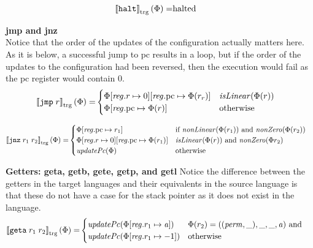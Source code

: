 \documentclass[a4paper]{article}
\newcommand{\sem}[1]{\left\llbracket #1 \right\rrbracket}
\newcommand{\tsem}[2][\Phi]{\sem{#2}_{\mathrm{trg}}(#1)}
\newcommand{\tand}{\text{ and }}
\newcommand{\totherwise}{\text{otherwise }}
\newcommand{\targetcolor}[1]{\color{black}}
\newcommand{\trg}[1]{{\targetcolor{} #1}}
\newcommand{\zinstr}[1]{\texttt{#1}}
\newcommand{\oneinstr}[2]{
  \ifthenelse{\equal{#2}{}}
  {\zinstr{#1}}
  {\zinstr{#1} \; #2}
}
\newcommand{\twoinstr}[3]{
  \ifthenelse{\equal{#2#3}{}}
  {\zinstr{#1}}
  {\zinstr{#1} \; #2 \; #3}
}
\newcommand{\thalt}{\zinstr{\trg{halt}}}
\newcommand{\tjmp}[1]{\oneinstr{\trg{jmp}}{#1}}
\newcommand{\tjnz}[2]{\twoinstr{\trg{jnz}}{#1}{#2}}
\newcommand{\tgeta}[2]{\twoinstr{\trg{geta}}{#1}{#2}}
\newcommand{\update}[2]{[#1 \mapsto #2]}
\newcommand{\updReg}[2]{\update{\reg.#1}{#2}}
\newcommand{\perm}{\var{perm}}
\newcommand{\halted}{\mathrm{halted}}
\newcommand{\var}[1]{\mathit{#1}}
\newcommand{\reg}{\var{reg}}
\newcommand{\aaddr}{\var{a}}
\newcommand{\pcreg}{\mathrm{pc}}
\newcommand{\plainfun}[2]{
  \ifthenelse{\equal{#2}{}}
  {\mathit{#1}}
  {\mathit{#1}(#2)}
}
\newcommand{\updPcAddr}[1]{\plainfun{updatePc}{#1}}
\newcommand{\nonLinear}[1]{\plainfun{nonLinear}{#1}}
\newcommand{\isLinear}[1]{\plainfun{isLinear}{#1}}
\newcommand{\nonZero}[1]{\plainfun{nonZero}{#1}}
\begin{document}
\begin{align*}
  \tsem{\thalt} = & \halted
\end{align*}

\textbf{jmp and jnz}\\
Notice that the order of the updates of the configuration actually matters here. As it is below, a successful jump to $\pcreg$ results in a loop, but if the order of the updates to the configuration had been reversed, then the execution would fail as the $\pcreg$ register would contain 0.
\begin{align*}
  \tsem{\tjmp{r}} = & 
                      \begin{cases}
                        \Phi\updReg{r}{0}\updReg{\pcreg}{\Phi(r_r)}
                             & \isLinear{\Phi(r)} \\
                        \Phi\updReg{\pcreg}{\Phi(r)} & \totherwise
                      \end{cases}
\end{align*}

\begin{align*}
  \tsem{\tjnz{r_1}{r_2}} = &       
                             \begin{cases}
                               \Phi\updReg{\pcreg}{r_1} & \text{if $\nonLinear{\Phi(r_1)}$ and $\nonZero{\Phi(r_2)}$} \\
                               \Phi\updReg{r}{0}\updReg{\pcreg}{\Phi(r_1)}
                                               & \arraycolsep=0pt                               
                                               \begin{array}[t]{l}
                                                 \isLinear{\Phi(r)} \tand
                                                 \nonZero{\Phi{r_2}}
                                               \end{array}
\\
                               \updPcAddr{\Phi} & \totherwise
                             \end{cases}
\end{align*}

\textbf{Getters: geta, getb, gete, getp, and getl}
Notice the difference between the getters in the target languages and their equivalents in the source language is that these do not have a case for the stack pointer as it does not exist in the language.
\begin{align*}
  \tsem{\tgeta{r_1}{r_2}} = &
                              \begin{cases}
                                \updPcAddr{\Phi\update{\reg.r_1}{\aaddr}} & 
                                \arraycolsep=0pt
                                \begin{array}[t]{l}
                                  \Phi(r_2) = ((\perm,\_),\_,\_,\aaddr) \tand \\
                                \end{array} \\
                                \updPcAddr{\Phi\updReg{r_1}{-1}} & \totherwise
                              \end{cases}
\end{align*}
\end{document}
